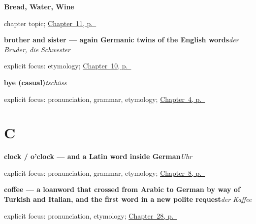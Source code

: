 \noindent\begin{minipage}[t]{\linewidth}
\raggedright
\textbf{Bread, Water, Wine}\par
\footnotesize chapter topic; \hyperref[ch:food]{Chapter~11, p.~\pageref*{ch:food}}
\end{minipage}\par\smallskip

\noindent\begin{minipage}[t]{\linewidth}
\raggedright
\textbf{brother and sister — again Germanic twins of the English words}\enspace\emph{der Bruder, die Schwester}\par
\footnotesize explicit focus: etymology; \hyperref[ch:family]{Chapter~10, p.~\pageref*{ch:family}}
\end{minipage}\par\smallskip

\noindent\begin{minipage}[t]{\linewidth}
\raggedright
\textbf{bye (casual)}\enspace\emph{tschüss}\par
\footnotesize explicit focus: pronunciation, grammar, etymology; \hyperref[ch:farewells]{Chapter~4, p.~\pageref*{ch:farewells}}
\end{minipage}\par\smallskip

\section*{C}

\noindent\begin{minipage}[t]{\linewidth}
\raggedright
\textbf{clock / o'clock — and a Latin word inside German}\enspace\emph{Uhr}\par
\footnotesize explicit focus: pronunciation, grammar, etymology; \hyperref[ch:time]{Chapter~8, p.~\pageref*{ch:time}}
\end{minipage}\par\smallskip

\noindent\begin{minipage}[t]{\linewidth}
\raggedright
\textbf{coffee — a loanword that crossed from Arabic to German by way of Turkish and Italian, and the first word in a new polite request}\enspace\emph{der Kaffee}\par
\footnotesize explicit focus: pronunciation, etymology; \hyperref[ch:ge-coffee-tea-milk]{Chapter~28, p.~\pageref*{ch:ge-coffee-tea-milk}}
\end{minipage}\par\smallskip


